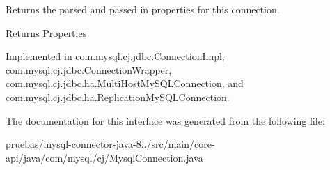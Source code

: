 Returns the parsed and passed in properties for this connection.

\begin{DoxyReturn}{Returns}
\mbox{\hyperlink{}{Properties}} 
\end{DoxyReturn}


Implemented in \mbox{\hyperlink{classcom_1_1mysql_1_1cj_1_1jdbc_1_1_connection_impl_a63bb38c4e47986e5b187fb3fefb9aec6}{com.\+mysql.\+cj.\+jdbc.\+Connection\+Impl}}, \mbox{\hyperlink{classcom_1_1mysql_1_1cj_1_1jdbc_1_1_connection_wrapper_a76eea5af4534baf71ff0852b0c0f6f9c}{com.\+mysql.\+cj.\+jdbc.\+Connection\+Wrapper}}, \mbox{\hyperlink{classcom_1_1mysql_1_1cj_1_1jdbc_1_1ha_1_1_multi_host_my_s_q_l_connection_a4a717cb95caa93ac7469d50383e2882b}{com.\+mysql.\+cj.\+jdbc.\+ha.\+Multi\+Host\+My\+S\+Q\+L\+Connection}}, and \mbox{\hyperlink{classcom_1_1mysql_1_1cj_1_1jdbc_1_1ha_1_1_replication_my_s_q_l_connection_a04a60b0695519e98a4827f90161f52da}{com.\+mysql.\+cj.\+jdbc.\+ha.\+Replication\+My\+S\+Q\+L\+Connection}}.



The documentation for this interface was generated from the following file\+:\begin{DoxyCompactItemize}
\item 
pruebas/mysql-\/connector-\/java-\/8../src/main/core-\/api/java/com/mysql/cj/Mysql\+Connection.\+java\end{DoxyCompactItemize}
